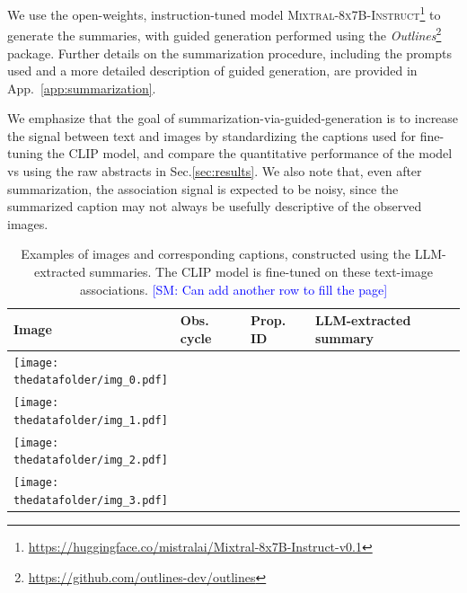 \documentclass[10pt]{article} %
\newcommand{\package}[1]{\textsl{#1}\xspace}
\newcommand{\SM}[1]{\textcolor{blue}{[SM: #1]}}
\newcommand{\datafolder}[1]{\def\thedatafolder{#1}}
\begin{document}
We use the open-weights, instruction-tuned model \textsc{Mixtral-8x7B-Instruct}\footnote{\url{https://huggingface.co/mistralai/Mixtral-8x7B-Instruct-v0.1}} to generate the summaries, with guided generation performed using the \package{Outlines}\footnote{\url{https://github.com/outlines-dev/outlines}} package. Further details on the summarization procedure, including the prompts used and a more detailed description of guided generation, are provided in App.~\ref{app:summarization}.

We emphasize that the goal of summarization-via-guided-generation is to increase the signal between text and images by standardizing the captions used for fine-tuning the CLIP model, and compare the quantitative performance of the model vs using the raw abstracts in Sec.\ref{sec:results}. We also note that, even after summarization, the association signal is expected to be noisy, since the summarized caption may not always be usefully descriptive of the observed images.

\datafolder{./plots/data/}
 
\begin{table}[h!]
      \centering
      \begin{tabular}{m{} p{1.9cm} p{1.9cm} m{8cm}}
          \toprule
          \centering \bfseries Image & \centering \bfseries Obs. cycle & \centering \bfseries Prop. ID & \centering \bfseries LLM-extracted summary \tabularnewline
          \midrule
          \centering \texttt{[image: \\thedatafolder/img\_0.pdf]} & \centering  & \centering  &  {\scriptsize } \tabularnewline
          \midrule
          \centering \texttt{[image: \\thedatafolder/img\_1.pdf]} & \centering  & \centering  &  {\scriptsize } \tabularnewline
          \midrule
          \centering \texttt{[image: \\thedatafolder/img\_2.pdf]} & \centering  & \centering  &  {\scriptsize } \tabularnewline
          \midrule
          \centering \texttt{[image: \\thedatafolder/img\_3.pdf]} & \centering  & \centering  &  {\scriptsize } \tabularnewline
          \bottomrule
      \end{tabular}
      \caption{Examples of images and corresponding captions, constructed using the LLM-extracted summaries. The CLIP model is fine-tuned on these text-image associations. \SM{Can add another row to fill the page}}
      \label{tab:dataset}
  \end{table}
\end{document}
